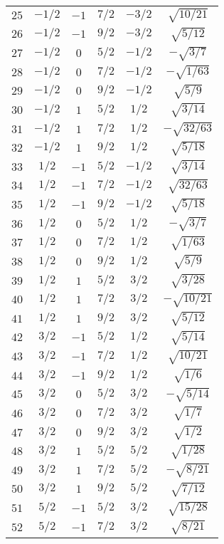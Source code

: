 \begin{table}
\begin{center}
\begin{tabular}{|c|c|c|c|c|c|}
$25$ & $-1/2$ & $-1$ & $7/2$ & $-3/2$ & $\sqrt{10/21}$ \\ 
$26$ & $-1/2$ & $-1$ & $9/2$ & $-3/2$ & $\sqrt{5/12}$ \\ 
$27$ & $-1/2$ & $0$ & $5/2$ & $-1/2$ & $-\sqrt{3/7}$ \\ 
$28$ & $-1/2$ & $0$ & $7/2$ & $-1/2$ & $-\sqrt{1/63}$ \\ 
$29$ & $-1/2$ & $0$ & $9/2$ & $-1/2$ & $\sqrt{5/9}$ \\ 
$30$ & $-1/2$ & $1$ & $5/2$ & $1/2$ & $\sqrt{3/14}$ \\ 
$31$ & $-1/2$ & $1$ & $7/2$ & $1/2$ & $-\sqrt{32/63}$ \\ 
$32$ & $-1/2$ & $1$ & $9/2$ & $1/2$ & $\sqrt{5/18}$ \\ 
$33$ & $1/2$ & $-1$ & $5/2$ & $-1/2$ & $\sqrt{3/14}$ \\ 
$34$ & $1/2$ & $-1$ & $7/2$ & $-1/2$ & $\sqrt{32/63}$ \\ 
$35$ & $1/2$ & $-1$ & $9/2$ & $-1/2$ & $\sqrt{5/18}$ \\ 
$36$ & $1/2$ & $0$ & $5/2$ & $1/2$ & $-\sqrt{3/7}$ \\ 
$37$ & $1/2$ & $0$ & $7/2$ & $1/2$ & $\sqrt{1/63}$ \\ 
$38$ & $1/2$ & $0$ & $9/2$ & $1/2$ & $\sqrt{5/9}$ \\ 
$39$ & $1/2$ & $1$ & $5/2$ & $3/2$ & $\sqrt{3/28}$ \\ 
$40$ & $1/2$ & $1$ & $7/2$ & $3/2$ & $-\sqrt{10/21}$ \\ 
$41$ & $1/2$ & $1$ & $9/2$ & $3/2$ & $\sqrt{5/12}$ \\ 
$42$ & $3/2$ & $-1$ & $5/2$ & $1/2$ & $\sqrt{5/14}$ \\ 
$43$ & $3/2$ & $-1$ & $7/2$ & $1/2$ & $\sqrt{10/21}$ \\ 
$44$ & $3/2$ & $-1$ & $9/2$ & $1/2$ & $\sqrt{1/6}$ \\ 
$45$ & $3/2$ & $0$ & $5/2$ & $3/2$ & $-\sqrt{5/14}$ \\ 
$46$ & $3/2$ & $0$ & $7/2$ & $3/2$ & $\sqrt{1/7}$ \\ 
$47$ & $3/2$ & $0$ & $9/2$ & $3/2$ & $\sqrt{1/2}$ \\ 
$48$ & $3/2$ & $1$ & $5/2$ & $5/2$ & $\sqrt{1/28}$ \\ 
$49$ & $3/2$ & $1$ & $7/2$ & $5/2$ & $-\sqrt{8/21}$ \\ 
$50$ & $3/2$ & $1$ & $9/2$ & $5/2$ & $\sqrt{7/12}$ \\ 
$51$ & $5/2$ & $-1$ & $5/2$ & $3/2$ & $\sqrt{15/28}$ \\ 
$52$ & $5/2$ & $-1$ & $7/2$ & $3/2$ & $\sqrt{8/21}$ \\ 

\end{tabular}
\end{center}
\end{table}
